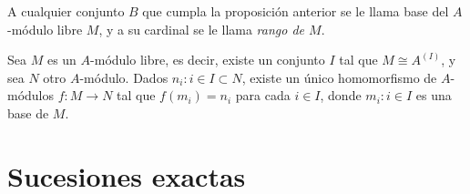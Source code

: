 \documentclass[../main.tex]{subfiles}
\begin{document}
\begin{definition}
	A cualquier conjunto $B$ que cumpla la proposición anterior se le llama base del $A$-módulo libre $M$, y a su cardinal se le llama \textit{rango de $M$}.
\end{definition}

\begin{corollary}
	Sea $M$ es un $A$-módulo libre, es decir, existe un conjunto $I$ tal que $M\cong A^{(I)}$, y sea $N$ otro $A$-módulo. Dados ${n_i:i\in I}\subset N$, existe un único homomorfismo de $A$-módulos $f:M\rightarrow N$ tal que $f(m_i)=n_i$ para cada $i\in I$, donde ${m_i: i\in I}$ es una base de $M$.
\end{corollary}

\section{Sucesiones exactas}
\end{document}
